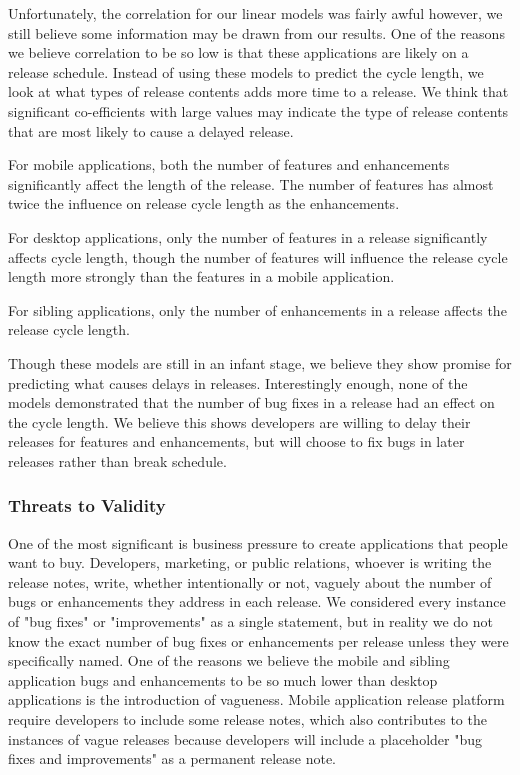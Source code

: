 \documentclass{acm_proc_article-sp}
\begin{document}
\begin{center}


\end{center}

Unfortunately, the correlation for our linear models was fairly awful however, we still believe some information may be drawn from our results.
One of the reasons we believe correlation to be so low is that these applications are likely on a release schedule.
Instead of using these models to predict the cycle length, we look at what types of release contents adds more time to a release.
We think that significant co-efficients with large values may indicate the type of release contents that are most likely to cause a delayed release. 

For mobile applications, both the number of features and enhancements significantly affect the length of the release.
The number of features has almost twice the influence on release cycle length as the enhancements. 

For desktop applications,  only the number of features in a release significantly affects cycle length, though the number of features will influence the release cycle length more strongly than the features in a mobile application.

For sibling applications, only the number of enhancements in a release affects the release cycle length.

Though these models are still in an infant stage, we believe they show promise for predicting what causes delays in releases.
Interestingly enough, none of the models demonstrated that the number of bug fixes in a release had an effect on the cycle length.
We believe this shows developers are willing to delay their releases for features and enhancements, but will choose to fix bugs in later releases rather than break schedule.


\subsubsection{Threats to Validity}

One of the most significant is business pressure to create applications that people want to buy.
Developers, marketing, or public relations, whoever is writing the release notes, write, whether intentionally or not, vaguely about the number of bugs or enhancements they address in each release. 
We considered every instance of "bug fixes" or "improvements" as a single statement, but in reality we do not know the exact number of bug fixes or enhancements per release unless they were specifically named.
One of the reasons we believe the mobile and sibling application bugs and enhancements to be so much lower than desktop applications is the introduction of vagueness.
Mobile application release platform require developers to include some release notes, which also contributes to the instances of vague releases because developers will include a placeholder "bug fixes and improvements" as a permanent release note.
\end{document}
